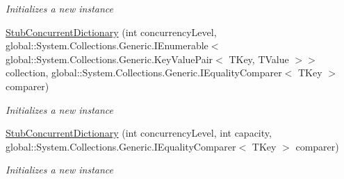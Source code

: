 \begin{DoxyCompactItemize}
\begin{DoxyCompactList}\small\item\em Initializes a new instance\end{DoxyCompactList}\item 
\hyperlink{class_system_1_1_collections_1_1_concurrent_1_1_fakes_1_1_stub_concurrent_dictionary_3_01_t_key_00_01_t_value_01_4_a0673c6dfbae954009be3e6e4e59cbf1c}{Stub\-Concurrent\-Dictionary} (int concurrency\-Level, global\-::\-System.\-Collections.\-Generic.\-I\-Enumerable$<$ global\-::\-System.\-Collections.\-Generic.\-Key\-Value\-Pair$<$ T\-Key, T\-Value $>$$>$ collection, global\-::\-System.\-Collections.\-Generic.\-I\-Equality\-Comparer$<$ T\-Key $>$ comparer)
\begin{DoxyCompactList}\small\item\em Initializes a new instance\end{DoxyCompactList}\item 
\hyperlink{class_system_1_1_collections_1_1_concurrent_1_1_fakes_1_1_stub_concurrent_dictionary_3_01_t_key_00_01_t_value_01_4_a528e653b894d592a3e2de92143b2de6f}{Stub\-Concurrent\-Dictionary} (int concurrency\-Level, int capacity, global\-::\-System.\-Collections.\-Generic.\-I\-Equality\-Comparer$<$ T\-Key $>$ comparer)
\begin{DoxyCompactList}\small\item\em Initializes a new instance\end{DoxyCompactList}\end{DoxyCompactItemize}
